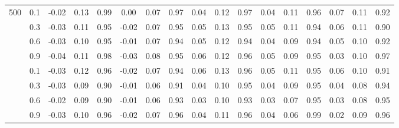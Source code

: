 \begin{landscape}
\begin{table}
\begin{tabular}[t]{c@{\hskip 1.5em}c@{\hskip 1.5em} ccc@{\hskip 1.25em} ccc@{\hskip 1.25em} ccc@{\hskip 1.25em} ccc@{\hskip 1.25em} ccc}
\multirow{4}{*}{500}  & 0.1 & -0.02 & 0.13 & 0.99 & 0.00 & 0.07 & 0.97 & 0.04 & 0.12 & 0.97 & 0.04 & 0.11 & 0.96 & 0.07 & 0.11 & 0.92\\
 & 0.3 & -0.03 & 0.11 & 0.95 & -0.02 & 0.07 & 0.95 & 0.05 & 0.13 & 0.95 & 0.05 & 0.11 & 0.94 & 0.06 & 0.11 & 0.90\\
 & 0.6 & -0.03 & 0.10 & 0.95 & -0.01 & 0.07 & 0.94 & 0.05 & 0.12 & 0.94 & 0.04 & 0.09 & 0.94 & 0.05 & 0.10 & 0.92\\
 & 0.9 & -0.04 & 0.11 & 0.98 & -0.03 & 0.08 & 0.95 & 0.06 & 0.12 & 0.96 & 0.05 & 0.09 & 0.95 & 0.03 & 0.10 & 0.97\\
\addlinespace[0.5em]

\multirow{4}{*}{1000}  & 0.1 & -0.03 & 0.12 & 0.96 & -0.02 & 0.07 & 0.94 & 0.06 & 0.13 & 0.96 & 0.05 & 0.11 & 0.95 & 0.06 & 0.10 & 0.91\\
 & 0.3 & -0.03 & 0.09 & 0.90 & -0.01 & 0.06 & 0.91 & 0.04 & 0.10 & 0.95 & 0.04 & 0.09 & 0.95 & 0.04 & 0.08 & 0.94\\
 & 0.6 & -0.02 & 0.09 & 0.90 & -0.01 & 0.06 & 0.93 & 0.03 & 0.10 & 0.93 & 0.03 & 0.07 & 0.95 & 0.03 & 0.08 & 0.95\\
 & 0.9 & -0.03 & 0.10 & 0.96 & -0.02 & 0.07 & 0.96 & 0.04 & 0.11 & 0.96 & 0.04 & 0.06 & 0.99 & 0.02 & 0.09 & 0.96\\
\bottomrule
\end{tabular}
\end{table}
\end{landscape}